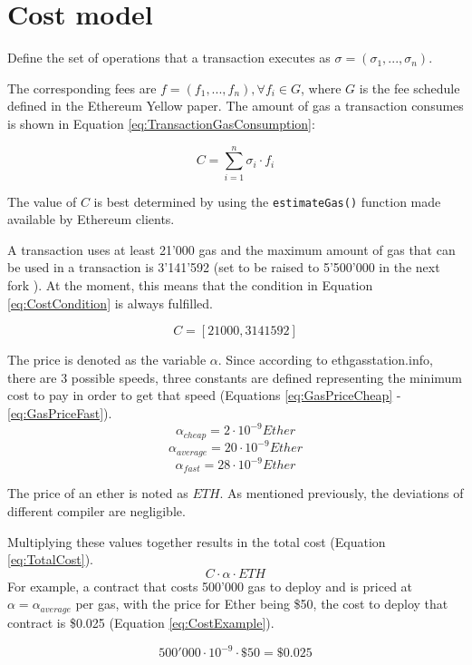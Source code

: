 \section{Cost model}

Define the set of operations that a transaction executes as $ \sigma = (\sigma_1, ..., \sigma_n) $.

The corresponding fees are $ f = (f_1, ..., f_n), \forall f_i \in G $, where $ G $ is the fee schedule defined in the Ethereum Yellow paper. The amount of gas a transaction consumes is shown in Equation \ref{eq:TransactionGasConsumption}:

\begin{equation}
C = \sum_{i = 1}^n \sigma_i \cdot f_i
\label{eq:TransactionGasConsumption}
\end{equation}

The value of $ C $ is best determined by using the \texttt{estimateGas()} function made available by Ethereum clients.

A transaction uses at least 21'000 gas and the maximum amount of gas that can be used in a transaction is 3'141'592 (set to be raised to 5'500'000 in the next fork \cite{EIP150}). At the moment, this means that the condition in Equation \ref{eq:CostCondition} is always fulfilled.

\begin{equation}
    C = [21000, 3141592]
    \label{eq:CostCondition}
\end{equation}

The price is denoted as the variable $ \alpha $. Since according to ethgasstation.info, there are 3 possible speeds, three constants are defined representing the minimum cost to pay in order to get that speed (Equations \ref{eq:GasPriceCheap} - \ref{eq:GasPriceFast}).
\begin{equation}
    \alpha_{cheap} = 2 \cdot 10^{-9} Ether
    \label{eq:GasPriceCheap}
\end{equation}
\begin{equation}
    \alpha_{average} = 20 \cdot 10^{-9} Ether
    \label{eq:GasPriceAverage}
\end{equation}
\begin{equation}
    \alpha_{fast} = 28 \cdot 10^{-9} Ether
    \label{eq:GasPriceFast}
\end{equation}

The price of an ether is noted as $ ETH $. As mentioned previously, the deviations of different compiler are negligible.

Multiplying these values together results in the total cost (Equation \ref{eq:TotalCost}). 
\begin{equation}
 C \cdot \alpha \cdot ETH
 \label{eq:TotalCost}
\end{equation}  For example, a contract that costs 500'000 gas to deploy and is priced at $ \alpha = \alpha_{average} $ per gas, with the price for Ether being \$50, the cost to deploy that contract is \$0.025 (Equation \ref{eq:CostExample}).

\begin{equation}
    500'000 \cdot 10^{-9} \cdot \$50 = \$0.025
    \label{eq:CostExample}
\end{equation}
